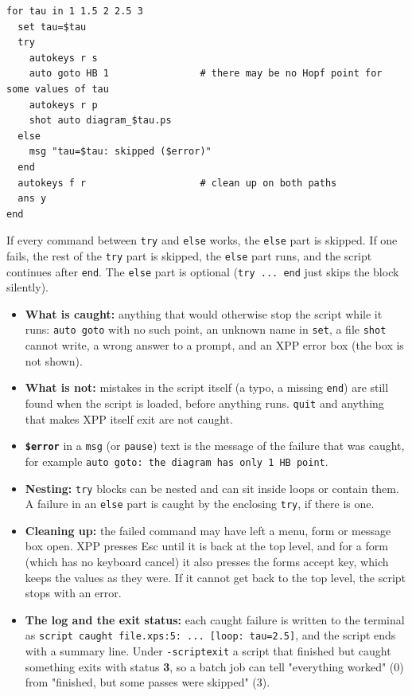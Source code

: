\documentclass{article}
\providecommand{\tightlist}{\setlength{\itemsep}{0pt}\setlength{\parskip}{0pt}}
\begin{document}
{\small\begin{verbatim}
for tau in 1 1.5 2 2.5 3
  set tau=$tau
  try
    autokeys r s
    auto goto HB 1                # there may be no Hopf point for some values of tau
    autokeys r p
    shot auto diagram_$tau.ps
  else
    msg "tau=$tau: skipped ($error)"
  end
  autokeys f r                    # clean up on both paths
  ans y
end
\end{verbatim}}

If every command between \texttt{try} and \texttt{else}
works, the \texttt{else} part is skipped. If one fails, the rest of
the \texttt{try} part is skipped, the \texttt{else} part runs,
and the script continues after \texttt{end}. The \texttt{else}
part is optional (\texttt{try\ ...\ end} just skips the block
silently).

\begin{itemize}
\tightlist
\item
  \textbf{What is caught:} anything that would otherwise stop
  the script while it runs: \texttt{auto\ goto} with no such point, an
  unknown name in \texttt{set}, a file \texttt{shot} cannot write,
  a wrong answer to a prompt, and an XPP error box (the box is not
  shown).
\item
  \textbf{What is not:} mistakes in the script itself (a typo,
  a missing \texttt{end}) are still found when the script is loaded,
  before anything runs. \texttt{quit} and anything that makes XPP
  itself exit are not caught.
\item
  \textbf{\texttt{\$error}} in a \texttt{msg} (or
  \texttt{pause}) text is the message of the failure that was caught,
  for example
  \texttt{auto\ goto:\ the\ diagram\ has\ only\ 1\ HB\ point}.
\item
  \textbf{Nesting:} \texttt{try} blocks can be nested and
  can sit inside loops or contain them. A failure in an \texttt{else}
  part is caught by the enclosing \texttt{try}, if there is one.
\item
  \textbf{Cleaning up:} the failed command may have left a
  menu, form or message box open. XPP presses Esc until it is back at the
  top level, and for a form (which has no keyboard cancel) it also presses
  the form\textquotesingle s accept key, which keeps the values as they were. If it cannot
  get back to the top level, the script stops with an error.
\item
  \textbf{The log and the exit status:} each caught failure is
  written to the terminal as
  \texttt{script\ caught\ file.xps:5:\ ...\ {[}loop:\ tau=2.5{]}}, and the
  script ends with a summary line. Under \texttt{-scriptexit} a script
  that finished but caught something exits with status \textbf{3},
  so a batch job can tell "everything worked" (0) from "finished, but some
  passes were skipped" (3).
\end{itemize}
\end{document}
